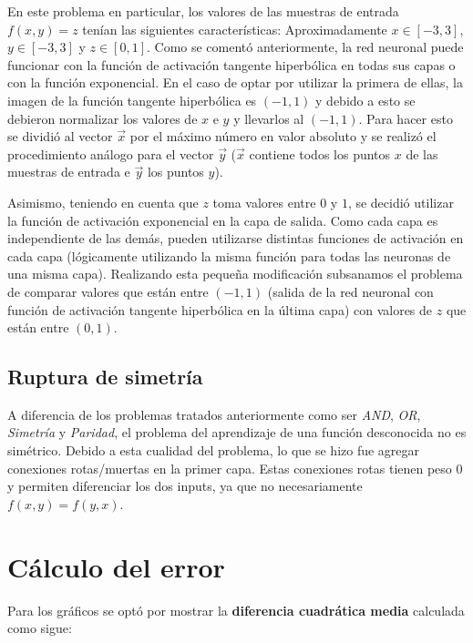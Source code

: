 \documentclass[%
    final,
    reprint,
    notitlepage,
    narroweqnarray,
    inline,
    twoside,
    invited
    ]{ieee}
\begin{document}
\par En este problema en particular, los valores de las muestras de entrada $f(x,y) = z$ tenían las siguientes características: Aproximadamente $x\in [-3,3]$, $y\in [-3,3]$ y $z\in [0,1]$. 
Como se comentó anteriormente, la red neuronal puede funcionar con la función de activación tangente hiperbólica en todas sus capas o con la función exponencial. En el caso de optar por utilizar la primera de ellas, la imagen de la función tangente hiperbólica es $(-1,1)$ y debido a esto se debieron normalizar los valores de $x$ e $y$ y llevarlos al $(-1,1)$. Para hacer esto se dividió al vector  $\vec{x}$ por el máximo número en valor absoluto y se realizó el procedimiento análogo para el vector $\vec{y}$ ($\vec{x}$ contiene todos los puntos $x$ de las muestras de entrada e $\vec{y}$ los puntos $y$).\\
\par Asimismo, teniendo en cuenta que $z$ toma valores entre $0$ y $1$, se decidió utilizar la función de activación exponencial en la capa de salida. Como cada capa es independiente de las demás, pueden utilizarse distintas funciones de activación en cada capa (lógicamente utilizando la misma función para todas las neuronas de una misma capa). Realizando esta pequeña modificación subsanamos el problema de comparar valores que están entre $(-1,1)$ (salida de la red neuronal con función de activación tangente hiperbólica en la última capa) con valores de $z$ que están entre $(0,1)$.

\subsection{Ruptura de simetría}

\par A diferencia de los problemas tratados anteriormente como ser \textit{AND}, \textit{OR}, \textit{Simetría} y \textit{Paridad}, el problema del aprendizaje de una función desconocida no es simétrico. Debido a esta cualidad del problema, lo que se hizo fue agregar conexiones rotas/muertas en la primer capa. Estas conexiones rotas tienen peso 
$0$ y permiten diferenciar los dos inputs, ya que no necesariamente $f(x, y) = f(y,x)$.

\section{Cálculo del error}

\par Para los gráficos se optó por mostrar la \textbf{diferencia cuadrática media} calculada como sigue:\\
\end{document}

